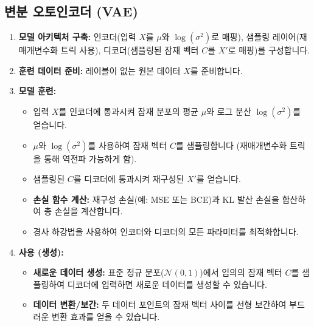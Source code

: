 \documentclass[11pt,a4paper]{article}
\theoremstyle{definition}
\begin{document}
\subsection{변분 오토인코더 (VAE)}
\begin{enumerate}
    \item \textbf{모델 아키텍처 구축:} 인코더(입력 $X$를 $\mu$와 $\log(\sigma^2)$로 매핑), 샘플링 레이어(재매개변수화 트릭 사용), 디코더(샘플링된 잠재 벡터 $C$를 $X'$로 매핑)를 구성합니다.
    \item \textbf{훈련 데이터 준비:} 레이블이 없는 원본 데이터 $X$를 준비합니다.
    \item \textbf{모델 훈련:}
    \begin{itemize}
        \item 입력 $X$를 인코더에 통과시켜 잠재 분포의 평균 $\mu$와 로그 분산 $\log(\sigma^2)$를 얻습니다.
        \item $\mu$와 $\log(\sigma^2)$를 사용하여 잠재 벡터 $C$를 샘플링합니다 (재매개변수화 트릭을 통해 역전파 가능하게 함).
        \item 샘플링된 $C$를 디코더에 통과시켜 재구성된 $X'$를 얻습니다.
        \item \textbf{손실 함수 계산:} 재구성 손실(예: MSE 또는 BCE)과 KL 발산 손실을 합산하여 총 손실을 계산합니다.
        \item 경사 하강법을 사용하여 인코더와 디코더의 모든 파라미터를 최적화합니다.
    \end{itemize}
    \item \textbf{사용 (생성):}
    \begin{itemize}
        \item \textbf{새로운 데이터 생성:} 표준 정규 분포($\mathcal{N}(0, 1)$)에서 임의의 잠재 벡터 $C$를 샘플링하여 디코더에 입력하면 새로운 데이터를 생성할 수 있습니다.
        \item \textbf{데이터 변환/보간:} 두 데이터 포인트의 잠재 벡터 사이를 선형 보간하여 부드러운 변환 효과를 얻을 수 있습니다.
    \end{itemize}
\end{enumerate}
\end{document}
